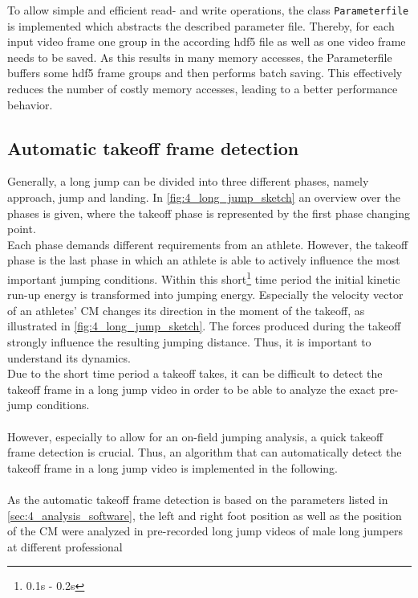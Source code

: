 \noindent To allow simple and efficient read- and write operations, the class
\texttt{Parameterfile} is implemented which abstracts the described parameter
file.
Thereby, for each input video frame one group in the according hdf5 file as
well as one video frame needs to be saved.
As this results in many memory accesses, the Parameterfile buffers some hdf5
frame groups and then performs batch saving.
This effectively reduces the number of costly memory accesses, leading to
a better performance behavior.

\subsection{Automatic takeoff frame detection}\label{subsec:4_takeoff_detection}
Generally, a long jump can be divided into three different phases, namely
approach, jump and landing.
In \autoref{fig:4_long_jump_sketch} an overview over the phases is given,
where the takeoff phase is represented by the first phase changing point.\\
Each phase demands different requirements from an athlete. 
However, the takeoff phase is the last phase in which an athlete is able to
actively influence the most important jumping conditions.
Within this short\footnote{0.1s - 0.2s\cite{mechanical_power_long_jump}} time
period the initial kinetic run-up energy is transformed into jumping energy.
Especially the velocity vector of an athletes' \ac{CM} changes its direction
in the moment of the takeoff, as illustrated in
\autoref{fig:4_long_jump_sketch}.
The forces produced during the takeoff strongly influence the resulting
jumping distance. 
Thus, it is important to understand its dynamics.\\
Due to the short time period a takeoff takes, it can be difficult to detect
the takeoff frame in a long jump video in order to be able to analyze the
exact pre-jump conditions.\\\\
However, especially to allow for an on-field jumping analysis, a quick takeoff
frame detection is crucial.
Thus, an algorithm that can automatically detect the takeoff frame in a long
jump video is implemented in the following.\\\\
As the automatic takeoff frame detection is based on the parameters listed in
\autoref{sec:4_analysis_software}, the left and right
foot position as well as the position of the \ac{CM} were analyzed in
pre-recorded long jump videos of male long jumpers at different professional
